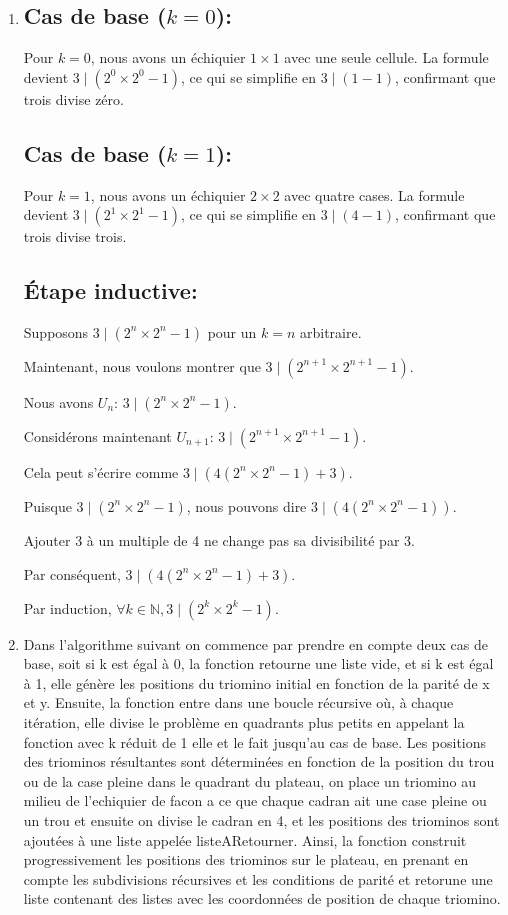 \documentclass[16pt]{report}
\begin{document}
\begin{multicols*}{2}
\begin{enumerate}
    \item

\subsection*{Cas de base ($k = 0$):}
Pour $k = 0$, nous avons un échiquier $1 \times 1$ avec une seule cellule. La formule devient $3 \mid (2^0 \times 2^0 - 1)$, ce qui se simplifie en $3 \mid (1 - 1)$, confirmant que trois divise zéro.

\subsection*{Cas de base ($k = 1$):}
Pour $k = 1$, nous avons un échiquier $2 \times 2$ avec quatre cases. La formule devient $3 \mid (2^1 \times 2^1 - 1)$, ce qui se simplifie en $3 \mid (4 - 1)$, confirmant que trois divise trois.

\subsection*{Étape inductive:}
Supposons $3 \mid (2^n \times 2^n - 1)$ pour un $k = n$ arbitraire.

Maintenant, nous voulons montrer que $3 \mid (2^{n+1} \times 2^{n+1} - 1)$.

Nous avons $U_n$: $3 \mid (2^n \times 2^n - 1)$.

Considérons maintenant $U_{n+1}$: $3 \mid (2^{n+1} \times 2^{n+1} - 1)$.

Cela peut s'écrire comme $3 \mid (4(2^n \times 2^n - 1) + 3)$.

Puisque $3 \mid (2^n \times 2^n - 1)$, nous pouvons dire $3 \mid (4(2^n \times 2^n - 1))$.

Ajouter 3 à un multiple de 4 ne change pas sa divisibilité par 3.

Par conséquent, $3 \mid (4(2^n \times 2^n - 1) + 3)$.

Par induction, $\forall k \in \mathbb{N}, 3 \mid (2^k \times 2^k - 1)$.


\item Dans l'algorithme suivant on commence par prendre en compte deux cas de base, soit si k est égal à 0, la fonction retourne une liste vide, et si k est égal à 1, elle génère les positions du triomino initial en fonction de la parité de x et y. Ensuite, la fonction entre dans une boucle récursive où, à chaque itération, elle divise le problème en quadrants plus petits en appelant la fonction avec k réduit de 1 elle et le fait jusqu'au cas de base. Les positions des triominos résultantes sont déterminées en fonction de la position du trou ou de la case pleine dans le quadrant du plateau, on place un triomino au milieu de l'echiquier de facon a ce que chaque cadran ait une case pleine ou un trou et ensuite on divise le cadran en 4, et les positions des triominos sont ajoutées à une liste appelée listeARetourner. Ainsi, la fonction construit progressivement les positions des triominos sur le plateau, en prenant en compte les subdivisions récursives et les conditions de parité et retorune une liste contenant des listes avec les coordonnées de position de chaque triomino.


\end{enumerate}
\end{multicols*}
\end{document}
